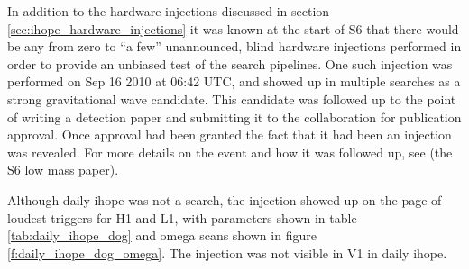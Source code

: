 In addition to the hardware injections discussed in section
\ref{sec:ihope_hardware_injections} it was known at the start of S6
that there would be any from zero to ``a few'' unannounced, blind
hardware injections performed in order to provide an unbiased test of
the search pipelines.  One such injection was performed on Sep 16
2010 at 06:42 UTC, and showed up in multiple searches as a strong
gravitational wave candidate.  This candidate was followed up to the
point of writing a detection paper and submitting it to the
collaboration for publication approval.  Once approval had been
granted the fact that it had been an injection was revealed.  For more
details on the event and how it was followed up, see (the S6 low mass
paper).

Although daily ihope was not a search, the injection showed up on the
page of loudest triggers for H1 and L1, with parameters shown in table
\ref{tab:daily_ihope_dog} and omega scans shown in figure
\ref{f:daily_ihope_dog_omega}.  The injection was not visible in V1 in
daily ihope.

